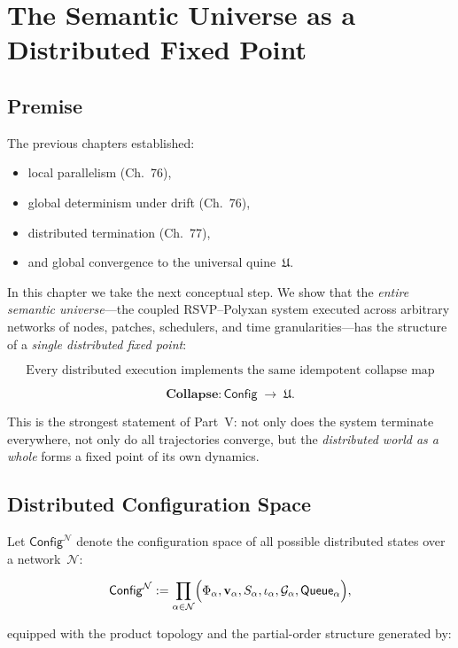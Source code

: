 \chapter{The Semantic Universe as a Distributed Fixed Point}
\label{ch:78}

\section{Premise}

The previous chapters established:

\begin{itemize}
\item local parallelism (Ch.~76),
\item global determinism under drift (Ch.~76),
\item distributed termination (Ch.~77),
\item and global convergence to the universal quine~$\mathfrak{U}$.
\end{itemize}

In this chapter we take the next conceptual step.  
We show that the \emph{entire semantic universe}---the coupled RSVP--Polyxan
system executed across arbitrary networks of nodes, patches, schedulers,
and time granularities---has the structure of a \emph{single distributed fixed point}:

\[
\boxed{
\text{Every distributed execution implements the same idempotent collapse map}
}
\]

\[
\mathbf{Collapse}
  : \mathsf{Config}
  \;\longrightarrow\;
    \mathfrak{U}.
\]

This is the strongest statement of Part~V:
not only does the system terminate everywhere,
not only do all trajectories converge,
but the \emph{distributed world as a whole} forms
a fixed point of its own dynamics.


\section{Distributed Configuration Space}

Let $\mathsf{Config}^{\mathcal{N}}$ denote the configuration space of
all possible distributed states over a network~$\mathcal{N}$:

\[
\mathsf{Config}^{\mathcal{N}}
  :=
  \prod_{\alpha \in \mathcal{N}}
    \Bigl(
      \Phi_\alpha, \mathbf{v}_\alpha, S_\alpha,
      \iota_\alpha, \mathcal{G}_\alpha,
      \mathsf{Queue}_\alpha
    \Bigr),
\]

equipped with the product topology and the partial-order structure
generated by:

